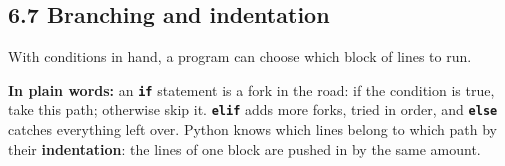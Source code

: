 \documentclass[11pt]{article}
\begin{document}
\begin{keepsection}
\section{6.7 Branching and indentation}

With conditions in hand, a program can choose which block of lines to run.

\begin{plainbox}\textbf{In plain words:} an \textbf{\texttt{if}} statement is a fork in the road: if the condition is true, take this path; otherwise skip it. \textbf{\texttt{elif}} adds more forks, tried in order, and \textbf{\texttt{else}} catches everything left over. Python knows which lines belong to which path by their \textbf{indentation}: the lines of one block are pushed in by the same amount.\end{plainbox}


\end{keepsection}
\end{document}
